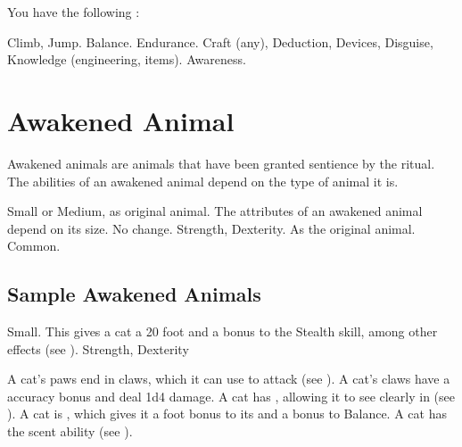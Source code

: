       You have the following :
      \begin{raggeditemize}
         Climb, Jump.
         Balance.
         Endurance.
         Craft (any), Deduction, Devices, Disguise, Knowledge (engineering, items).
         Awareness.
      \end{raggeditemize}

\section{Awakened Animal}

  Awakened animals are animals that have been granted sentience by the  ritual.
  The abilities of an awakened animal depend on the type of animal it is.

   Small or Medium, as original animal.
   The attributes of an awakened animal depend on its size.
   No change.
    Strength,  Dexterity.
   As the original animal.
   Common.

  \subsection{Sample Awakened Animals}


     Small. This gives a cat a 20 foot  and a  bonus to the Stealth skill, among other effects (see ).
      Strength,  Dexterity
    \begin{raggeditemize}
       A cat's paws end in claws, which it can use to attack (see ). A cat's claws have a  accuracy bonus and deal 1d4 damage.
       A cat has , allowing it to see clearly in  (see ).
       A cat is , which gives it a  foot bonus to its  and a  bonus to Balance.
       A cat has the scent ability (see ).
    \end{raggeditemize}

